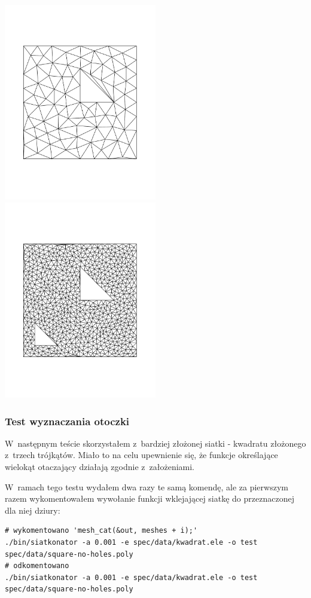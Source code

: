 \documentclass[a4paper]{article} \usepackage{setspace}
\begin{document}
\includegraphics[width=0.5\textwidth]{1_trojkat.pdf}
\includegraphics[width=0.5\textwidth]{2_trojkaty.pdf}

\subsubsection{Test wyznaczania otoczki}
W~następnym teście skorzystałem z~bardziej złożonej siatki - kwadratu złożonego z~trzech trójkątów.
Miało to na celu upewnienie się, że funkcje określające wielokąt otaczający działają zgodnie z~założeniami.

W~ramach tego testu wydałem dwa razy te samą komendę, ale za pierwszym razem wykomentowałem wywołanie funkcji wklejającej siatkę do przeznaczonej dla niej dziury:
\begin{lstlisting}
# wykomentowano 'mesh_cat(&out, meshes + i);'
./bin/siatkonator -a 0.001 -e spec/data/kwadrat.ele -o test spec/data/square-no-holes.poly
# odkomentowano
./bin/siatkonator -a 0.001 -e spec/data/kwadrat.ele -o test spec/data/square-no-holes.poly
\end{lstlisting}
\end{document}
